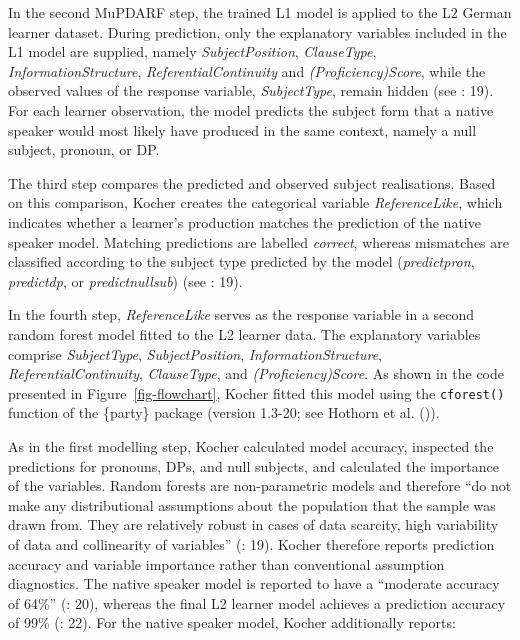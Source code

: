 \documentclass[
  letterpaper,
  DIV=11,
  numbers=noendperiod]{scrartcl}
\begin{document}
In the second MuPDARF step, the trained L1 model is applied to the L2
German learner dataset. During prediction, only the explanatory
variables included in the L1 model are supplied, namely
\emph{SubjectPosition}, \emph{ClauseType}, \emph{InformationStructure},
\emph{ReferentialContinuity} and \emph{(Proficiency)Score}, while the
observed values of the response variable, \emph{SubjectType}, remain
hidden (see : 19). For
each learner observation, the model predicts the subject form that a
native speaker would most likely have produced in the same context,
namely a null subject, pronoun, or DP.

The third step compares the predicted and observed subject realisations.
Based on this comparison, Kocher creates the categorical variable
\emph{ReferenceLike}, which indicates whether a learner's production
matches the prediction of the native speaker model. Matching predictions
are labelled \emph{correct}, whereas mismatches are classified according
to the subject type predicted by the model (\emph{predictpron},
\emph{predictdp}, or \emph{predictnullsub}) (see
: 19).

In the fourth step, \emph{ReferenceLike} serves as the response variable
in a second random forest model fitted to the L2 learner data. The
explanatory variables comprise \emph{SubjectType},
\emph{SubjectPosition}, \emph{InformationStructure},
\emph{ReferentialContinuity}, \emph{ClauseType}, and
\emph{(Proficiency)Score}. As shown in the code presented in
Figure~\ref{fig-flowchart}, Kocher fitted this model using the
\texttt{cforest()} function of the \{party\} package (version 1.3-20;
see Hothorn et al. ()).

As in the first modelling step, Kocher calculated model accuracy,
inspected the predictions for pronouns, DPs, and null subjects, and
calculated the importance of the variables. Random forests are
non-parametric models and therefore ``do not make any distributional
assumptions about the population that the sample was drawn from. They
are relatively robust in cases of data scarcity, high variability of
data and collinearity of variables''
(: 19). Kocher therefore
reports prediction accuracy and variable importance rather than
conventional assumption diagnostics. The native speaker model is
reported to have a ``moderate accuracy of 64\%''
(: 20), whereas the
final L2 learner model achieves a prediction accuracy of 99\%
(: 22). For the native
speaker model, Kocher additionally reports:
\end{document}
